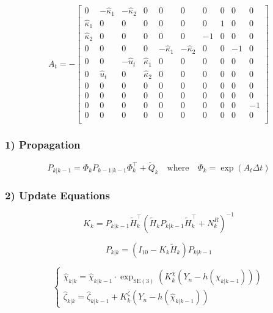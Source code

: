 \documentclass[11pt]{article}
\begin{document}
\begin{equation}
A_t = -
\begin{bmatrix}
0 & -\hat{\kappa}_1 & -\hat{\kappa}_2 & 0 & 0 & 0 & 0 & 0 & 0 & 0 \\
\hat{\kappa}_1 & 0 & 0 & 0 & 0 & 0 & 0 & 1 & 0 & 0 \\
\hat{\kappa}_2 & 0 & 0 & 0 & 0 & 0 & -1 & 0 & 0 & 0 \\
0 & 0 & 0 & 0 & -\hat{\kappa}_1 & -\hat{\kappa}_2 & 0 & 0 & -1 & 0 \\
0 & 0 & -\hat{u}_t & \hat{\kappa}_1 & 0 & 0 & 0 & 0 & 0 & 0 \\
0 & \hat{u}_t & 0 & \hat{\kappa}_2 & 0 & 0 & 0 & 0 & 0 & 0 \\
0 & 0 & 0 & 0 & 0 & 0 & 0 & 0 & 0 & 0 \\
0 & 0 & 0 & 0 & 0 & 0 & 0 & 0 & 0 & 0 \\
0 & 0 & 0 & 0 & 0 & 0 & 0 & 0 & 0 & -1 \\
0 & 0 & 0 & 0 & 0 & 0 & 0 & 0 & 0 & 0 \\
\end{bmatrix}
\label{eq:At_matrix}
\end{equation}

\subsubsection*{1) Propagation}

\begin{equation}
P_{k|k-1} = \Phi_k P_{k-1|k-1} \Phi_k^\top + \check{Q}_k
\quad \text{where} \quad
\Phi_k = \exp(A_t \Delta t)
\label{eq:propagation}
\end{equation}

\subsubsection*{2) Update Equations}

\begin{equation}
K_k = P_{k|k-1} \tilde{H}_k^\top \left( \tilde{H}_k P_{k|k-1} \tilde{H}_k^\top + N^R_k \right)^{-1}
\label{eq:kalman_gain}
\end{equation}

\begin{equation}
P_{k|k} = \left( I_{10} - K_k \tilde{H}_k \right) P_{k|k-1}
\label{eq:cov_update}
\end{equation}

\begin{equation}
\begin{cases}
\hat{\chi}_{k|k} = \hat{\chi}_{k|k-1} \cdot \exp_{\mathrm{SE}(3)}\left( K^\chi_k \left( Y_n - h(\hat{\chi}_{k|k-1}) \right) \right) \\
\hat{\zeta}_{k|k} = \hat{\zeta}_{k|k-1} + K^\zeta_k \left( Y_n - h(\hat{\chi}_{k|k-1}) \right)
\end{cases}
\label{eq:lie_vector_update}
\end{equation}
\end{document}
